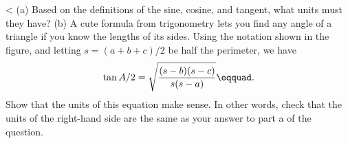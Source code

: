  <%
(a) Based on the definitions of the sine, cosine, and tangent, what units
must they have?
(b) A cute formula from trigonometry lets you find any angle of
a triangle if you know the lengths of its sides. Using the
notation shown in the figure, and letting $s=(a+b+c)/2$ be half the
perimeter, we have 
\begin{equation*}
  \tan A/2=\sqrt{\frac{(s-b)(s-c)}{s(s-a)}}\eqquad.
\end{equation*}
Show that the units of this equation make sense. In other words, check that the
units of the right-hand side are the same as your answer to part a of the question.
